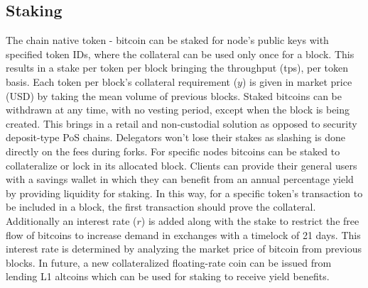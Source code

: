 \documentclass[../Bitcoin Blink.tex]{subfiles}
\begin{document}
\subsection{Staking}
The chain native token - bitcoin can be staked for node's public keys with specified token IDs, where the collateral can be used only once for a block. This results in a stake per token per block bringing the throughput (tps), per token basis. Each token per block's collateral requirement ($y$) is given in market price (USD) by taking the mean volume of previous blocks. Staked bitcoins can be withdrawn at any time, with no vesting period, except when the block is being created. This brings in a retail and non-custodial solution as opposed to security deposit-type PoS chains. Delegators won't lose their stakes as slashing is done directly on the fees during forks. For specific nodes bitcoins can be staked to collateralize or lock in its allocated block. Clients can provide their general users with a savings wallet in which they can benefit from an annual percentage yield by providing liquidity for staking. In this way, for a specific token's transaction to be included in a block, the first transaction should prove the collateral. Additionally an interest rate ($r$) is added along with the stake to restrict the free flow of bitcoins to increase demand in exchanges with a timelock of 21 days. This interest rate is determined by analyzing the market price of bitcoin from previous blocks. In future, a new collateralized floating-rate coin can be issued from lending L1 altcoins which can be used for staking to receive yield benefits. 
\end{document}
